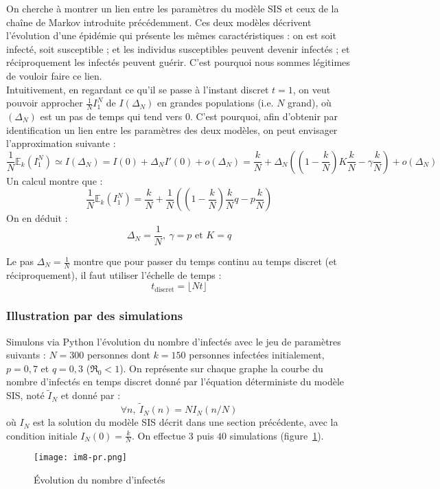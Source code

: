 \documentclass[a4paper,10.9pt]{article}
\begin{document}
On cherche à montrer un lien entre les paramètres du modèle SIS et ceux de la chaîne de Markov introduite précédemment. Ces deux modèles décrivent l'évolution d'une épidémie qui présente les mêmes caractéristiques : on est soit infecté, soit susceptible ; et les individus susceptibles peuvent devenir infectés ; et réciproquement les infectés peuvent guérir. C'est pourquoi nous sommes légitimes de vouloir faire ce lien. \\


Intuitivement, en regardant ce qu'il se passe à l'instant discret $t=1$, on veut pouvoir approcher $\frac{1}{N} I^N_1$ de $I(\Delta_N)$ en grandes populations (i.e. $N$ grand), où $(\Delta_N)$ est un pas de temps qui tend vers $0$. C'est pourquoi, afin d'obtenir par identification un lien entre les paramètres des deux modèles, on peut envisager l'approximation suivante :
$$\frac{1}{N}\mathbb{E}_k(I^N_1) \simeq I(\Delta_N)=I(0)+\Delta_N I'(0)+o(\Delta_N)=\frac{k}{N}+\Delta_N \left( \left(1-\frac{k}{N} \right)K\frac{k}{N}-\gamma \frac{k}{N} \right)+o(\Delta_N)$$
Un calcul montre que :
$$\frac{1}{N}\mathbb{E}_k(I^N_1)=\frac{k}{N}+\frac{1}{N} \left( \left(1-\frac{k}{N} \right)\frac{k}{N}q-p\frac{k}{N} \right)$$
On en déduit : 
$$\boxed{\Delta_N=\frac{1}{N}, \ \gamma=p \text{ et } K=q}$$

Le pas $\Delta_N=\frac{1}{N}$ montre que pour passer du temps continu au temps discret (et réciproquement), il faut utiliser l'échelle de temps :
$$t_{\text{discret}}=\lfloor Nt \rfloor$$

\subsubsection{Illustration par des simulations}
Simulons via Python l'évolution du nombre d'infectés avec le jeu de paramètres suivants : $N=300$ personnes dont $k=150$ personnes infectées initialement, $p=0,7$ et $q=0,3$ ($\mathfrak{R}_0<1$). On représente sur chaque graphe la courbe du nombre d'infectés en temps discret donné par l'équation déterministe du modèle SIS, noté $\tilde{I}_N$ et donné par :
$$\forall n, \ \tilde{I}_N(n)=N I_N(n/N)$$
où $I_N$ est la solution du modèle SIS décrit dans une section précédente, avec la condition initiale $I_N(0)=\frac{k}{N}$.
On effectue $3$ puis $40$ simulations (figure~\ref{fig:nb_inf1}).

\begin{figure}[h!]
  \centering
  \texttt{[image: im8-pr.png]} %
  \caption{Évolution du nombre d'infectés}
  \label{fig:nb_inf1}
\end{figure}
\end{document}
